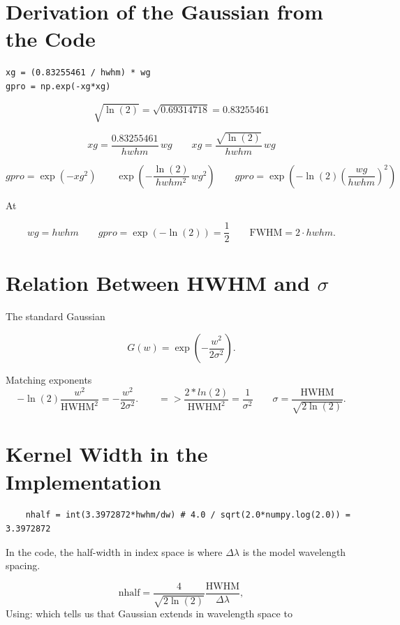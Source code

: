 \documentclass[11pt]{article}
\begin{document}
\section*{Derivation of the Gaussian from the Code}
\begin{verbatim}
xg = (0.83255461 / hwhm) * wg
gpro = np.exp(-xg*xg)
\end{verbatim}


\[
    \sqrt{\ln(2)} = \sqrt{0.69314718} = 0.83255461
\]

\[
    xg = \frac{0.83255461}{hwhm} \, wg
    \qquad
    xg =\frac{\sqrt{\ln(2)}}{hwhm} \, wg
\]

\[
    gpro =    \exp(-xg^2)
    \qquad
    \exp\left(
    -
    \frac{\ln(2)}{hwhm^2}
    \, wg^2
    \right)
    \qquad
    gpro =
    \exp\left(
    -
    \ln(2)
    \left(
        \frac{wg}{hwhm}
        \right)^2
    \right)
\]

At

\[
    wg = hwhm
    \qquad
    gpro =
    \exp(-\ln(2))
    =
    \frac{1}{2}
    \qquad
    \mathrm{FWHM} = 2 \cdot hwhm.
\]


\section*{Relation Between HWHM and $\sigma$}

The standard Gaussian

\[
    G(w) = \exp\left( -\frac{w^2}{2\sigma^2} \right).
\]

Matching exponents
\[
    - \ln(2)\frac{w^2}{\mathrm{HWHM}^2}
    =
    - \frac{w^2}{2\sigma^2}.
    \qquad
    =>
    \frac{2 * ln(2)}{\mathrm{HWHM}^2} =\frac{1}{\sigma^2}
    \qquad
    \sigma = \frac{\mathrm{HWHM}}{\sqrt{2\ln(2)}}.
\]

\section*{Kernel Width in the Implementation}

\begin{verbatim}
    nhalf = int(3.3972872*hwhm/dw) # 4.0 / sqrt(2.0*numpy.log(2.0)) = 3.3972872
\end{verbatim}

In the code, the half-width in index space is
where $\Delta\lambda$ is the model wavelength spacing.

\[
    \text{nhalf}
    =
    \frac{4}{\sqrt{2\ln(2)}}
    \frac{\mathrm{HWHM}}{\Delta\lambda},
\]
Using: which tells us that Gaussian extends in wavelength space to
\end{document}
